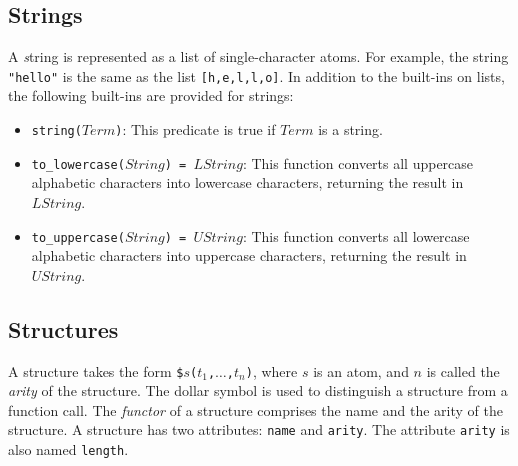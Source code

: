 \subsection{\label{subsec:strings}Strings}
A {\emph string} is represented as a list of single-character atoms. For example, the string \texttt{"hello"} is the same as the list \texttt{[h,e,l,l,o]}. In addition to the built-ins on lists, the following built-ins are provided for strings:
\begin{itemize}
\item \texttt{string($Term$)}: This predicate is true if $Term$ is a string. 
\item \texttt{to\_lowercase($String$) = $LString$}: This function converts all uppercase alphabetic characters into lowercase characters, returning the result in $LString$.
\item \texttt{to\_uppercase($String$) = $UString$}: This function converts all lowercase alphabetic characters into uppercase characters, returning the result in $UString$.
\end{itemize}

\subsection{Structures}
A structure takes the form \texttt{\$$s$($t_1$,$\ldots$,$t_{n}$)}, where $s$ is an atom, and $n$ is called the \emph{arity} of the structure. The dollar symbol is used to distinguish a structure from a function call. The \emph{functor} of a structure comprises the name and the arity of the structure. A structure has two attributes: \texttt{name} and \texttt{arity}. The attribute \texttt{arity} is also named \texttt{length}. 

